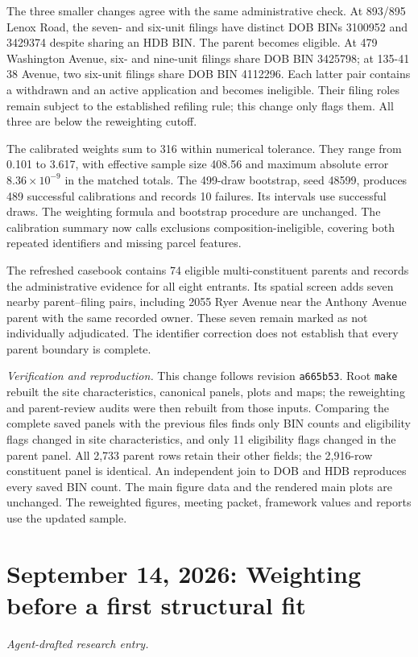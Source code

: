 The three smaller changes agree with the same administrative check. At
893/895 Lenox Road, the seven- and six-unit filings have distinct DOB BINs
3100952 and 3429374 despite sharing an HDB BIN. The parent becomes eligible.
At 479 Washington Avenue, six- and nine-unit filings share DOB BIN 3425798;
at 135-41 38 Avenue, two six-unit filings share DOB BIN 4112296. Each latter
pair contains a withdrawn and an active application and becomes ineligible.
Their filing roles remain subject to the established refiling rule; this
change only flags them. All three are below the reweighting cutoff.

The calibrated weights sum to 316 within numerical tolerance. They range from
0.101 to 3.617, with effective sample size 408.56 and maximum absolute error
$8.36\times10^{-9}$ in the matched totals. The 499-draw bootstrap, seed 48599,
produces 489 successful calibrations and records 10 failures. Its intervals
use successful draws. The weighting formula and bootstrap procedure are
unchanged. The calibration summary now calls exclusions composition-ineligible,
covering both repeated identifiers and missing parcel features.

The refreshed casebook contains 74 eligible multi-constituent parents and
records the administrative evidence for all eight entrants. Its spatial
screen adds seven nearby parent--filing pairs, including 2055 Ryer Avenue
near the Anthony Avenue parent with the same recorded owner. These seven
remain marked as not individually adjudicated. The identifier correction
does not establish that every parent boundary is complete.

\textit{Verification and reproduction.} This change follows revision
\texttt{a665b53}. Root \texttt{make} rebuilt the site characteristics,
canonical panels, plots and maps; the reweighting and parent-review audits
were then rebuilt from those inputs. Comparing the complete saved panels with
the previous files finds only BIN counts and eligibility flags changed in
site characteristics, and only 11 eligibility flags changed in the parent
panel. All 2,733 parent rows retain their other fields; the 2,916-row
constituent panel is identical. An independent join to DOB and HDB reproduces
every saved BIN count. The main figure data and the rendered main plots are
unchanged. The reweighted figures, meeting packet, framework values and
reports use the updated sample.

\clearpage
\section*{September 14, 2026: Weighting before a first structural fit}
\textit{Agent-drafted research entry.}

